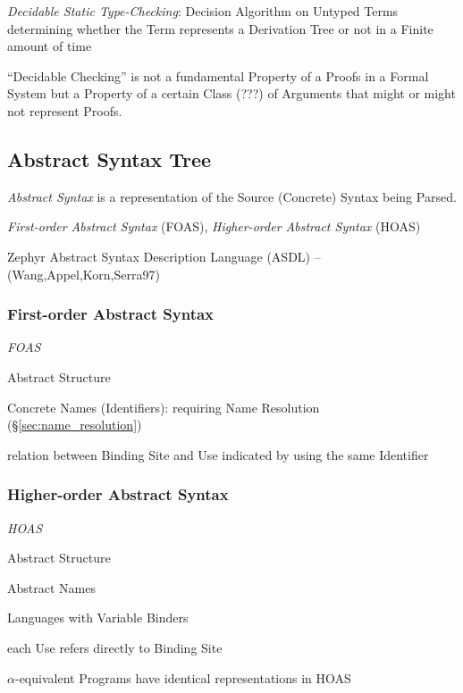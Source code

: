\emph{Decidable Static Type-Checking}: Decision Algorithm on Untyped
Terms determining whether the Term represents a Derivation Tree or not
in a Finite amount of time

``Decidable Checking'' is not a fundamental Property of a Proofs in a
Formal System but a Property of a certain Class (???) of Arguments
that might or might not represent Proofs.



\subsection{Abstract Syntax Tree}\label{sec:abstract_syntax}

\emph{Abstract Syntax} is a representation of the Source (Concrete)
Syntax being Parsed.

\emph{First-order Abstract Syntax} (FOAS), \emph{Higher-order Abstract
  Syntax} (HOAS)

\fist Zephyr Abstract Syntax Description Language (ASDL) --
(Wang,Appel,Korn,Serra97)



\subsubsection{First-order Abstract Syntax}\label{sec:foas}

\emph{FOAS}

Abstract Structure

Concrete Names (Identifiers): requiring Name Resolution
(\S\ref{sec:name_resolution})

relation between Binding Site and Use indicated by using the same
Identifier



\subsubsection{Higher-order Abstract Syntax}\label{sec:hoas}

\emph{HOAS}

Abstract Structure

Abstract Names

Languages with Variable Binders %

each Use refers directly to Binding Site

$\alpha$-equivalent Programs have identical representations in HOAS

